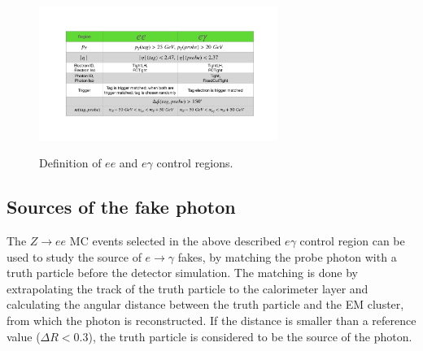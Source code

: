 \begin{figure}[!htbp]
\centering
{\includegraphics[width=0.69\textwidth]{figures/egammafakes/efakeCR.pdf}}
\caption [] {Definition of $ee$ and $e\gamma$ control regions.}
\label{fig:egammafake_cr}
\end{figure} 
\FloatBarrier

\subsection{Sources of the fake photon}
\label{sec:egammafakes_source}

The $Z\to ee$ MC events selected in the above described $e\gamma$ control region can be used to study the source of $e\to\gamma$ fakes, by matching the probe photon with a truth particle before the detector simulation. The matching is done by extrapolating the track of the truth particle to the calorimeter layer and calculating the angular distance between the truth particle and the EM cluster, from which the photon is reconstructed. If the distance is smaller than a reference value ($\Delta R < 0.3$), the truth particle is considered to be the source of the photon.

